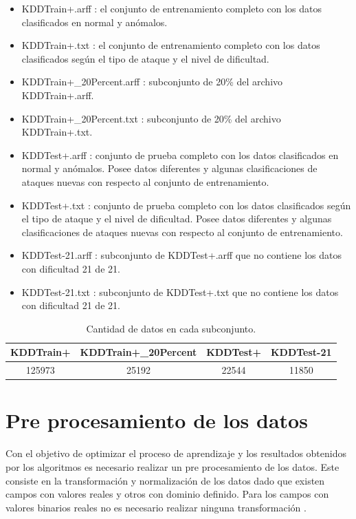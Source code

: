\begin{itemize}
    \item KDDTrain+.arff : el conjunto de entrenamiento completo con los datos clasificados en normal y anómalos.
    \item KDDTrain+.txt : el conjunto de entrenamiento completo con los datos clasificados según el tipo de ataque y el nivel de dificultad.
    \item KDDTrain+\_20Percent.arff : subconjunto de 20\% del archivo KDDTrain+.arff.
    \item KDDTrain+\_20Percent.txt : subconjunto de 20\% del archivo KDDTrain+.txt.
    \item KDDTest+.arff : conjunto de prueba completo con los datos clasificados en normal y anómalos. Posee datos diferentes y algunas clasificaciones de ataques nuevas con respecto al conjunto de entrenamiento.
    \item KDDTest+.txt : conjunto de prueba completo con los datos clasificados según el tipo de ataque y el nivel de dificultad. Posee datos diferentes y algunas clasificaciones de ataques nuevas con respecto al conjunto de entrenamiento.
    \item KDDTest-21.arff : subconjunto de KDDTest+.arff que no contiene los datos con dificultad 21 de 21.
    \item KDDTest-21.txt : subconjunto de KDDTest+.txt que no contiene los datos con dificultad 21 de 21.
\end{itemize}

\begin{table}[h]
    \begin{center}
        \caption{Cantidad de datos en cada subconjunto.}

        \label{tab:len_datasets}
        \begin{tabular}{c|c|c|c} %
        \textbf{KDDTrain+} & \textbf{KDDTrain+\_20Percent} & \textbf{KDDTest+} & \textbf{KDDTest-21}\\
        \hline
        125973 & 25192 & 22544 & 11850\\
        \end{tabular}
    \end{center}
\end{table}

\section{Pre procesamiento de los datos}
Con el objetivo de optimizar el proceso de aprendizaje y los resultados obtenidos por los algoritmos es necesario realizar un pre procesamiento de los datos. Este consiste en la transformación y normalización de los datos dado que existen campos con valores reales y otros con dominio definido. Para los campos con valores binarios reales no es necesario realizar ninguna transformación \cite{patro2015normalization}.

